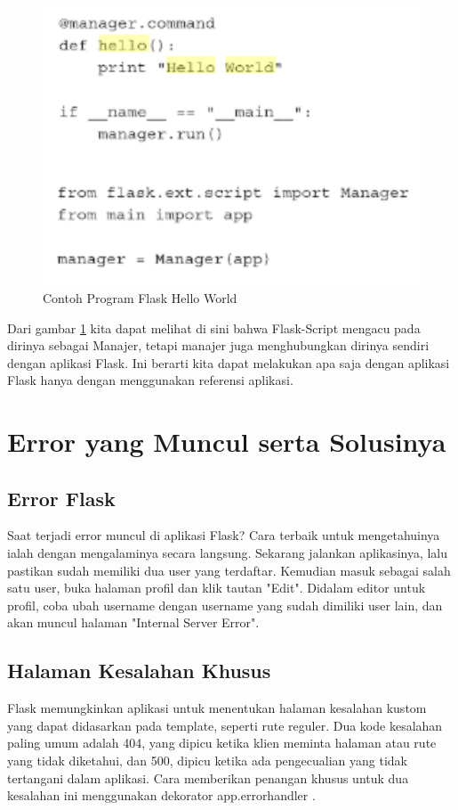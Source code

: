 \begin{figure}[ht]
\centerline{\includegraphics[width=1\textwidth]{figures/3HWFlask.PNG}}
\caption{Contoh Program Flask Hello World}
\label{gambarHWF1}
\end{figure}

Dari gambar \ref{gambarHWF1} kita dapat melihat di sini bahwa Flask-Script mengacu pada dirinya sebagai Manajer, tetapi manajer juga menghubungkan dirinya sendiri dengan aplikasi Flask. Ini berarti kita dapat melakukan apa saja dengan aplikasi Flask hanya dengan menggunakan referensi aplikasi\cite{copperwaite2015learning}.




\section{Error yang Muncul serta Solusinya}
\subsection{Error Flask}
Saat terjadi error muncul di aplikasi Flask? Cara terbaik untuk mengetahuinya ialah dengan mengalaminya secara langsung. Sekarang jalankan aplikasinya, lalu pastikan sudah memiliki dua user yang terdaftar. Kemudian masuk sebagai salah satu user, buka halaman profil dan klik tautan "Edit". Didalam editor untuk profil, coba ubah username dengan username yang sudah dimiliki user lain, dan akan muncul halaman "Internal Server Error"\cite{bae2016efficient}.


\subsection{Halaman Kesalahan Khusus}
Flask memungkinkan aplikasi untuk menentukan halaman kesalahan kustom yang dapat didasarkan pada template, seperti rute reguler. Dua kode kesalahan paling umum adalah 404, yang dipicu ketika klien meminta halaman atau rute yang tidak diketahui, dan 500, dipicu ketika ada pengecualian yang tidak tertangani dalam aplikasi. Cara memberikan penangan khusus untuk dua kesalahan ini menggunakan dekorator app.errorhandler \cite{grinberg2018flask}.


